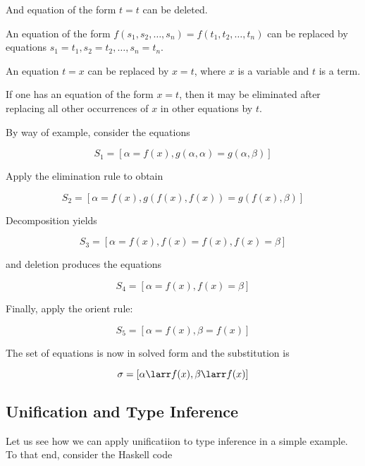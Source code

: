  And equation of the form $t = t$ can be deleted.

 An equation of the form $f(s_1, s_2, \ldots ,s_n) = f(t_1, t_2, \ldots ,t_n)$ can be replaced by equations $s_1 = t_1, s_2 = t_2, \ldots, s_n = t_n$.

 An equation $t = x$ can be replaced by $x = t$, where $x$ is a variable and $t$ is a term.

 If one has an equation of the form $x = t$, then it may be eliminated after replacing all other occurrences of $x$ in other equations by $t$.

By way of example, consider the equations

\begin{equation}
S_1 = [\alpha = f(x), g(\alpha, \alpha) = g(\alpha, \beta)]
\end{equation}

Apply the elimination rule to obtain 

\begin{equation}
S_2 = [\alpha = f(x), g(f(x), f(x)) = g(f(x), \beta)]
\end{equation}

Decomposition yields

\begin{equation}
S_3 = [\alpha = f(x), f(x) = f(x), f(x) = \beta]
\end{equation}

and deletion produces the equations 

\begin{equation}
S_4 = [\alpha = f(x), f(x) = \beta]
\end{equation}

Finally, apply the orient rule:

\begin{equation}
S_5 = [\alpha = f(x), \beta = f(x)]
\end{equation}

The set of equations is now in solved form and the substitution is 

\begin{equation}
\sigma = [\alpha \larr f(x), \beta \larr f(x)]
\end{equation}

\subsection{Unification and Type Inference}

Let us see how we can apply unificatiion to type inference in a simple example. To that end, consider the Haskell code

